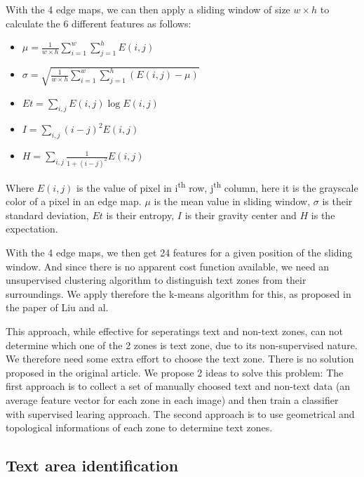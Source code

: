 \documentclass[paper=a4, french, 11pt]{scrartcl}
\begin{document}
With the 4 edge maps, we can then apply a sliding window of size $w \times h$ to calculate the 6 different features as follows:

\begin{itemize}
\item $\mu = \frac{1}{w \times h} \sum_{i=1}^{w} \sum_{j=1}^{h} E(i,j)$

\item $\sigma =\sqrt{\frac{1}{w \times h} \sum_{i=1}^{w} \sum_{j=1}^{h} (E(i,j) - \mu)}$

\item $ Et = \sum_{i,j} E(i,j)\log E(i,j) $

\item $ I = \sum_{i,j} (i-j)^2 E(i,j)$

\item $ H = \sum_{i,j} \frac{1}{1+(i-j)^2}E(i,j)$
\end{itemize}

Where $E(i,j)$ is the value of pixel in i\textsuperscript{th} row, j\textsuperscript{th} column, here it is the grayscale color of a pixel in an edge map. $\mu$ is the mean value in sliding window, $\sigma$ is their standard deviation, $ Et$ is their entropy, $ I$  is their gravity center and $ H$ is the expectation.

With the 4 edge maps, we then get 24 features for a given position of the sliding window. And since there is no apparent cost function available, we need an unsupervised clustering algorithm to distinguish text zones from their surroundings. We apply therefore the k-means algorithm for this, as proposed in the paper of Liu and al.

This approach, while effective for seperatings text and non-text zones, can not determine which one of the 2 zones is text zone, due to its non-supervised nature. We therefore need some extra effort to choose the text zone. There is no solution proposed in the original article. We propose 2 ideas to solve this problem: The first approach is to collect a set of manually choosed text and non-text data (an average feature vector for each zone in each image) and then train a classifier with supervised learing approach. The second approach is to use geometrical and topological informations of each zone to determine text zones.

\subsection{Text area identification} \mbox{} \vspace{-0.5cm}
\end{document}
